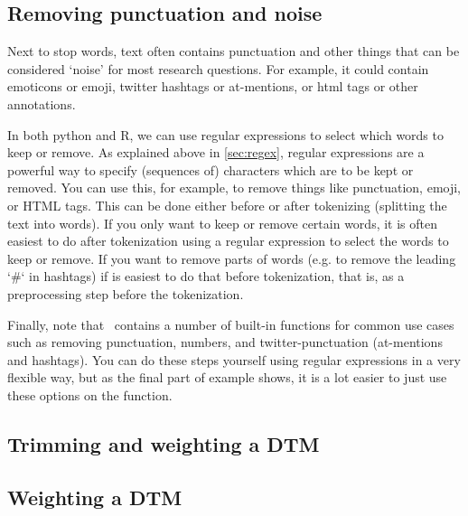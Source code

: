 

\subsection{Removing punctuation and noise}

Next to stop words, text often contains punctuation and other things that can be considered `noise' for most research questions.
For example, it could contain emoticons or emoji, twitter hashtags or at-mentions, or html tags or other annotations.

In both python and R, we can use regular expressions to select which words to keep or remove.
As explained above in \ref{sec:regex}, regular expressions are a powerful way to specify (sequences of) characters which are to be kept or removed.
You can use this, for example, to remove things like punctuation, emoji, or HTML tags.
This can be done either before or after tokenizing (splitting the text into words). 
If you only want to keep or remove certain words, it is often easiest to do after tokenization
using a regular expression to select the words to keep or remove.
If you want to remove parts of words (e.g. to remove the leading `#` in hashtags) if is easiest to do that before tokenization,
that is, as a preprocessing step before the tokenization.

Finally, note that \quanteda\ contains a number of built-in functions for common use cases such as removing
punctuation, numbers, and twitter-punctuation (at-mentions and hashtags).
You can do these steps yourself using regular expressions in a very flexible way, but as the final part of example 
shows, it is a lot easier to just use these options on the  function. 


\subsection{Trimming and weighting a DTM}




\subsection{Weighting a DTM}

